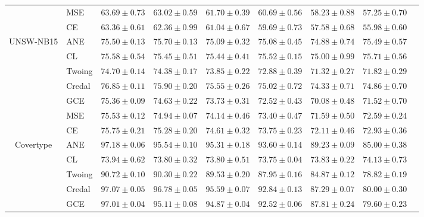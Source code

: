 \documentclass[letterpaper]{article} %
\begin{document}
\begin{table}[t]
\begin{tabular}{clccccccc}
 & MSE    & $\mathbf{63.69 \pm 0.73}$ & $\mathbf{63.02 \pm 0.59}$ & $\mathbf{61.70 \pm 0.39}$ & $\mathbf{60.69 \pm 0.56}$ & $\mathbf{58.23 \pm 0.88}$ & $\mathbf{57.25 \pm 0.70}$ \\ 
 & CE     & $\mathbf{63.36 \pm 0.61}$ & $\mathbf{62.36 \pm 0.99}$ & $61.04 \pm 0.67$ & $59.69 \pm 0.73$ & $57.58 \pm 0.68$ & $55.98 \pm 0.60$ \\ 
\hline
\multirow{7}{*}{UNSW-NB15}
 & ANE    & $75.50 \pm 0.13$ & $\mathbf{75.70 \pm 0.13}$ & $75.09 \pm 0.32$ & $\mathbf{75.08 \pm 0.45}$ & $\mathbf{74.88 \pm 0.74}$ & $\mathbf{75.49 \pm 0.57}$ \\ 
 & CL     & $75.58 \pm 0.54$ & $\mathbf{75.45 \pm 0.51}$ & $\mathbf{75.44 \pm 0.41}$ & $\mathbf{75.52 \pm 0.15}$ & $\mathbf{75.00 \pm 0.99}$ & $\mathbf{75.71 \pm 0.56}$ \\ 
 & Twoing & $74.70 \pm 0.14$ & $74.38 \pm 0.17$ & $73.85 \pm 0.22$ & $72.88 \pm 0.39$ & $71.32 \pm 0.27$ & $71.82 \pm 0.29$ \\ 
 & Credal & $\mathbf{76.85 \pm 0.11}$ & $\mathbf{75.90 \pm 0.20}$ & $\mathbf{75.55 \pm 0.26}$ & $\mathbf{75.02 \pm 0.72}$ & $\mathbf{74.33 \pm 0.71}$ & $\mathbf{74.86 \pm 0.70}$ \\ 
 & GCE    & $75.36 \pm 0.09$ & $74.63 \pm 0.22$ & $73.73 \pm 0.31$ & $72.52 \pm 0.43$ & $70.08 \pm 0.48$ & $71.52 \pm 0.70$ \\ 
 & MSE    & $75.53 \pm 0.12$ & $74.94 \pm 0.07$ & $74.14 \pm 0.46$ & $73.40 \pm 0.47$ & $71.59 \pm 0.50$ & $72.59 \pm 0.24$ \\ 
 & CE     & $75.75 \pm 0.21$ & $75.28 \pm 0.20$ & $74.61 \pm 0.32$ & $73.75 \pm 0.23$ & $72.11 \pm 0.46$ & $72.93 \pm 0.36$ \\ 
\hline
\multirow{7}{*}{Covertype}
 & ANE    & $97.18 \pm 0.06$ & $95.54 \pm 0.10$ & $95.31 \pm 0.18$ & $\mathbf{93.60 \pm 0.14}$ & $\mathbf{89.23 \pm 0.09}$ & $\mathbf{85.00 \pm 0.38}$ \\ 
 & CL     & $73.94 \pm 0.62$ & $73.80 \pm 0.32$ & $73.80 \pm 0.51$ & $73.75 \pm 0.04$ & $73.83 \pm 0.22$ & $74.13 \pm 0.73$ \\ 
 & Twoing & $90.72 \pm 0.10$ & $90.30 \pm 0.22$ & $89.53 \pm 0.20$ & $87.95 \pm 0.16$ & $84.87 \pm 0.12$ & $78.82 \pm 0.19$ \\ 
 & Credal & $97.07 \pm 0.05$ & $\mathbf{96.78 \pm 0.05}$ & $\mathbf{95.59 \pm 0.07}$ & $92.84 \pm 0.13$ & $87.29 \pm 0.07$ & $80.00 \pm 0.30$ \\ 
 & GCE    & $97.01 \pm 0.04$ & $95.11 \pm 0.08$ & $94.87 \pm 0.04$ & $92.52 \pm 0.06$ & $87.81 \pm 0.24$ & $79.60 \pm 0.23$ \\ 

\end{tabular}
\end{table}
\end{document}
